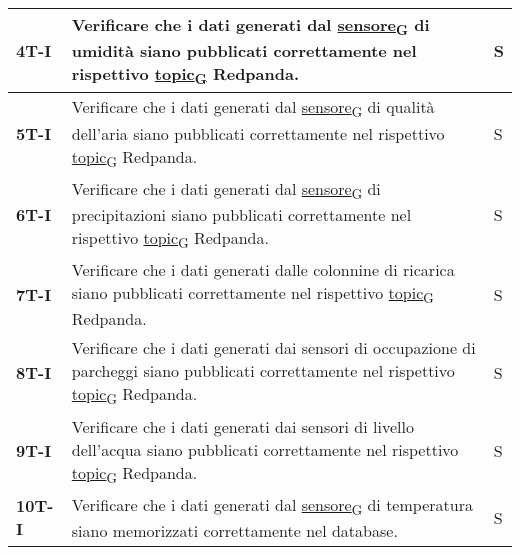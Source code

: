 \begin{longtable}{|>{\raggedright\arraybackslash}m{}|>{\raggedright\arraybackslash}m{}|>{\raggedright\arraybackslash}m{}|}
	\hline
	\textbf{4T-I}   & Verificare che i dati generati dal \href{https://7last.github.io/docs/rtb/documentazione-interna/glossario\#sensore}{sensore\textsubscript{G}} di umidità siano pubblicati correttamente nel rispettivo \href{https://7last.github.io/docs/rtb/documentazione-interna/glossario\#topic}{topic\textsubscript{G}} Redpanda.           & S              \\
	\hline
	\textbf{5T-I}   & Verificare che i dati generati dal \href{https://7last.github.io/docs/rtb/documentazione-interna/glossario\#sensore}{sensore\textsubscript{G}} di qualità dell'aria siano pubblicati correttamente nel rispettivo \href{https://7last.github.io/docs/rtb/documentazione-interna/glossario\#topic}{topic\textsubscript{G}} Redpanda. & S              \\
	\hline
	\textbf{6T-I}   & Verificare che i dati generati dal \href{https://7last.github.io/docs/rtb/documentazione-interna/glossario\#sensore}{sensore\textsubscript{G}} di precipitazioni siano pubblicati correttamente nel rispettivo \href{https://7last.github.io/docs/rtb/documentazione-interna/glossario\#topic}{topic\textsubscript{G}} Redpanda.    & S              \\
	\hline
	\textbf{7T-I}   & Verificare che i dati generati dalle colonnine di ricarica siano pubblicati correttamente nel rispettivo \href{https://7last.github.io/docs/rtb/documentazione-interna/glossario\#topic}{topic\textsubscript{G}} Redpanda.                                                                                                          & S              \\
	\hline
	\textbf{8T-I}   & Verificare che i dati generati dai sensori di occupazione di parcheggi siano pubblicati correttamente nel rispettivo \href{https://7last.github.io/docs/rtb/documentazione-interna/glossario\#topic}{topic\textsubscript{G}} Redpanda.                                                                                              & S              \\
	\hline
	\textbf{9T-I}   & Verificare che i dati generati dai sensori di livello dell'acqua siano pubblicati correttamente nel rispettivo \href{https://7last.github.io/docs/rtb/documentazione-interna/glossario\#topic}{topic\textsubscript{G}} Redpanda.                                                                                                    & S              \\
	\hline
	\textbf{10T-I}  & Verificare che i dati generati dal \href{https://7last.github.io/docs/rtb/documentazione-interna/glossario\#sensore}{sensore\textsubscript{G}} di temperatura siano memorizzati correttamente nel database.                                                                                                                         & S              \\

\end{longtable}
